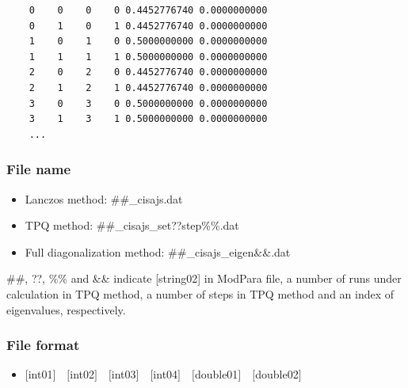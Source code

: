 \begin{minipage}{12.5cm}
\begin{screen}
\begin{verbatim}
    0    0    0    0 0.4452776740 0.0000000000
    0    1    0    1 0.4452776740 0.0000000000
    1    0    1    0 0.5000000000 0.0000000000
    1    1    1    1 0.5000000000 0.0000000000
    2    0    2    0 0.4452776740 0.0000000000
    2    1    2    1 0.4452776740 0.0000000000
    3    0    3    0 0.5000000000 0.0000000000
    3    1    3    1 0.5000000000 0.0000000000
    ...
\end{verbatim}
\end{screen}
\end{minipage}

\subsubsection{File name}
 \begin{itemize}
   \item{Lanczos method:}  \#\#\_cisajs.dat
   \item{TPQ method:} \#\#\_cisajs\_set??step\%\%.dat
   \item{Full diagonalization method:}  \#\#\_cisajs\_eigen{\&\&}.dat
  \end{itemize}
  \#\#, ??, \%\% and \&\& indicate [string02] in ModPara file, a number of runs under calculation in TPQ method, a number of steps in TPQ method and an index of eigenvalues, respectively.


\subsubsection{File format}
 \begin{itemize}
   \item  $[$int01$]$~~$[$int02$]$~~$[$int03$]$~~$[$int04$]$~~$[$double01$]$~~$[$double02$]$
  \end{itemize}
